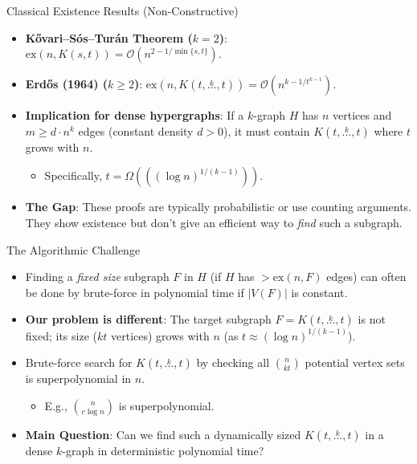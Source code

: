 \documentclass{beamer}
\newcommand{\ex}[2]{\ensuremath{\text{ex} \left( #1, #2 \right)}}
\newcommand{\compoverset}[2]{\ensuremath{K\left(#2, \overset{#1}{\dots}, #2\right)}} %
\newcommand{\bigO}[1]{\ensuremath{\mathcal{O}\left(#1\right)}}
\newcommand{\OmegaBig}[1]{\ensuremath{\Omega\left(#1\right)}} %
\begin{document}
\begin{frame}{Classical Existence Results (Non-Constructive)}
  \begin{itemize}
    \item \textbf{Kővari–Sós–Turán Theorem ($k=2$)}:
        $\ex{n}{K(s,t)} = \bigO{n^{2 - 1/\min\{s,t\}}}$.
    \pause
    \item \textbf{Erdős (1964) ($k \ge 2$)}:
        $\ex{n}{\compoverset{k}{t}} = \bigO{n^{k - 1/t^{k-1}}}$.
    \pause
    \item \textbf{Implication for dense hypergraphs}: If a $k$-graph $H$ has $n$ vertices and $m \ge d \cdot n^k$ edges (constant density $d > 0$), it must contain $\compoverset{k}{t}$ where $t$ grows with $n$.
    \begin{itemize}
        \item Specifically, $t = \OmegaBig{\left((\log n)^{1/(k-1)}\right)}$.
    \end{itemize}
    \pause
    \item \textbf{The Gap}: These proofs are typically probabilistic or use counting arguments. They show existence but don't give an efficient way to \emph{find} such a subgraph.
  \end{itemize}
\end{frame}

\begin{frame}{The Algorithmic Challenge}
  \begin{itemize}
    \item Finding a \emph{fixed size} subgraph $F$ in $H$ (if $H$ has $>\ex{n}{F}$ edges) can often be done by brute-force in polynomial time if $|V(F)|$ is constant.
    \pause
    \item \textbf{Our problem is different}: The target subgraph $F = \compoverset{k}{t}$ is not fixed; its size ($kt$ vertices) grows with $n$ (as $t \approx (\log n)^{1/(k-1)}$).
    \pause
    \item Brute-force search for $\compoverset{k}{t}$ by checking all $\binom{n}{kt}$ potential vertex sets is superpolynomial in $n$.
    \begin{itemize}
        \item E.g., $\binom{n}{c \log n}$ is superpolynomial.
    \end{itemize}
    \pause
    \item \textbf{Main Question}: Can we find such a dynamically sized $\compoverset{k}{t}$ in a dense $k$-graph in deterministic polynomial time?
  \end{itemize}
\end{frame}
\end{document}
